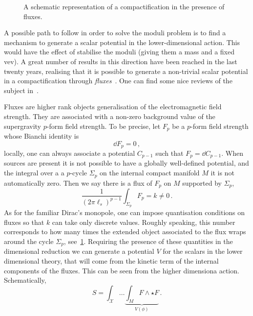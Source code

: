 \documentclass[debug]{phd}
\begin{document}
						\begin{figure}[h!]
							\centering
							
							\caption{A schematic representation of a compactification in the presence of fluxes.}
							\label{fluxcomp}
						\end{figure}
				A possible path to follow in order to solve the moduli problem is to find a mechanism to generate a scalar potential in the lower-dimensional action.
				This would have the effect of stabilise the moduli (giving them a mass and a fixed vev).
				A great number of results in this direction have been reached in the last twenty years, realising that it is possible to generate a non-trivial scalar potential in a compactification through \emph{fluxes}~\cite{fluxcomp1, fluxcomp2, fluxcomp3}.
				One can find some nice reviews of the subject in~\cite{DuffReviewComp, MarianaFluxReview, LustReviewComp, henlect}.
			
				Fluxes are higher rank objects generalisation of the electromagnetic field strength.
				They are associated with a non-zero background value of the supergravity $p$-form field strength.
				To be precise, let $F_p$ be a $p$-form field strength whose Bianchi identity is
						\begin{equation*}
							\dd F_p = 0\, ,
						\end{equation*}
				locally, one can always associate a potential $C_{p-1}$ such that $F_p = \dd C_{p-1}$. 
				When sources are present it is not possible to have a globally well-defined potential, and the integral over a a $p$-cycle $\Sigma_p$ on the internal compact manifold $M$ it is not automatically zero. 
				Then we say there is a flux of $F_p$ on $M$ supported by $\Sigma_p$,
						\begin{equation*}
							\frac{1}{(2\pi \ell_s)^{p-1}}\int_{\Sigma_p}\!\! F_p = k \neq 0\, .
						\end{equation*}
				As for the familiar Dirac's monopole, one can impose quantisation conditions on fluxes so that $k$ can take only discrete values.
				Roughly speaking, this number corresponds to how many times the extended object associated to the flux wraps around the cycle $\Sigma_p$, see~\cref{fluxcomp}.
				Requiring the presence of these quantities in the dimensional reduction we can generate a potential $V$ for the scalars in the lower dimensional theory, that will come from the kinetic term of the internal components of the fluxes.
				This can be seen from the higher dimensiona action. 
				Schematically,
						\begin{equation*}
							S= \int_{\mathcal{X}} \ldots \underbrace{\int_{M} F \wedge \star F}_{V(\phi)} \, .
						\end{equation*}
				
\end{document}
